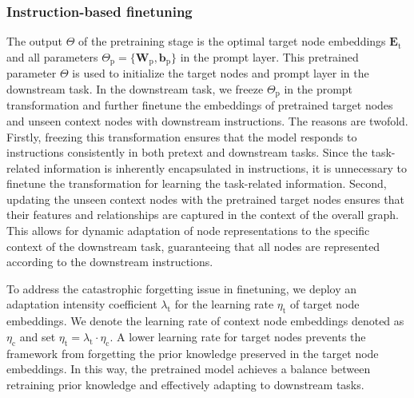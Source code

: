 \subsubsection{Instruction-based finetuning}
The output $\Theta$ of the pretraining stage is the optimal target node embeddings $\mathbf{E}_\text{t}$ and all parameters $\Theta_\text{p}=\{\mathbf{W}_\text{p},\mathbf{b}_\text{p}\}$ in the prompt layer. 
This pretrained parameter $\Theta$ is used to initialize the target nodes and prompt layer in the downstream task.  
In the downstream task, we freeze $\Theta_\text{p}$ in the prompt transformation and further finetune the embeddings of pretrained target nodes and unseen context nodes with downstream instructions. 
The reasons are twofold. Firstly, freezing this transformation ensures that the model responds to instructions
consistently in both pretext and downstream tasks. 
Since the task-related information is inherently encapsulated in instructions, it is unnecessary to finetune the transformation for learning the task-related information. 
Second, updating the unseen context nodes with the pretrained target nodes ensures that their features and relationships are captured in the context of the overall graph. 
This allows for dynamic adaptation of node representations to the specific context of the downstream task, guaranteeing that all nodes are represented according to the downstream instructions.

To address the catastrophic forgetting issue in finetuning, we deploy an adaptation intensity coefficient $\lambda_\text{t}$ for the learning rate $\eta_\text{t}$ of target node embeddings. 
We denote the learning rate of context node embeddings denoted as $\eta_\text{c}$ and set $\eta_\text{t} = \lambda_\text{t}\cdot\eta_\text{c}$. 
A lower learning rate for target nodes prevents the framework from forgetting the prior knowledge preserved in the target node embeddings. 
In this way, the pretrained model achieves a balance between retraining prior knowledge and effectively adapting to downstream tasks.


